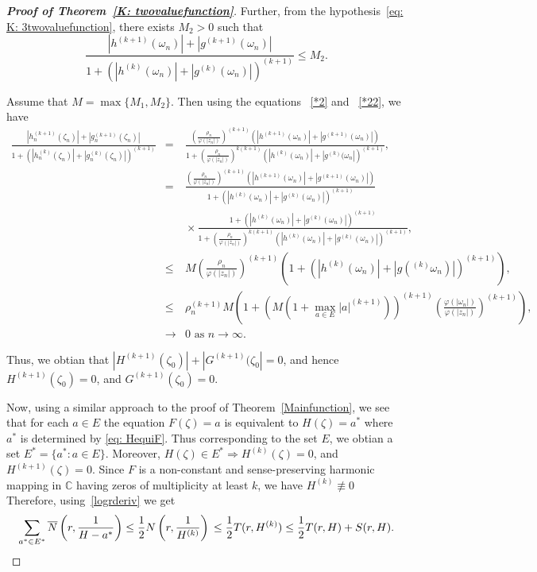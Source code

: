 \documentclass[11pt, reqno]{amsart}
\numberwithin{equation}{section}
\theoremstyle{definition}
\theoremstyle{remark}
\theoremstyle{plain}
\begin{document}
\begin{proof}[\bf{Proof of Theorem~\ref{K: twovaluefunction}}]
Further, from the hypothesis~\eqref{eq: K: 3twovaluefunction},
there exists $M_2>0$ such that
\begin{equation}\label{*22}
  \frac{|h^{(k+1)}(\omega_n)|+|g^{(k+1)}(\omega_n)|}
  {1+(|h^{(k)}(\omega_n)|+|g^{(k)}(\omega_n)|)^{(k+1)}}\leq M_2.
\end{equation}

Assume that $M=\max\{M_1, M_2\}$. Then using the equations ~\eqref{*2} 
and ~\eqref{*22}, we have
\begin{eqnarray*}
  \frac{|h_n^{(k+1)}(\zeta_n)|+|g_n^{(k+1)}(\zeta_n)|}
  {1+(|h_n^{(k)}(\zeta_n)|+|g_n^{(k)}(\zeta_n)|)^{(k+1)}} 
  &=& \frac{\left(\frac{\rho_n}{\varphi(|z_n|)}
  \right)^{(k+1)}\left(|h^{(k+1)}(\omega_n)|
  +|g^{(k+1)}(\omega_n)|\right)}{1+\left(\frac{\rho_n}
  {\varphi(|z_n|)}\right)^{k(k+1)}\left(|h^{(k)}(\omega_n)|+
  |g^{(k)}(\omega_n|\right)^{(k+1)}}, \\
  &=& \frac{\left(\frac{\rho_n}{\varphi(|z_n|)}\right)^{(k+1)}
  \left(|h^{(k+1)}(\omega_n)|+|g^{(k+1)}(\omega_n)|\right)}
  {1+\left(|h^{(k)}(\omega_n)|+|g^{(k)}(\omega_n)|\right)^{(k+1)}}\\ 
  &&\!\times\!
  \frac{1+\left(|h^{(k)}(\omega_n)|+|g^{(k)}(\omega_n)|\right)^{(k+1)}}
  {1+\left(\frac{\rho_n}{\varphi(|z_n|)}\right)^{k(k+1)}
  \left(|h^{(k)}(\omega_n)|+|g^{(k)}(\omega_n)|\right)^{(k+1)}}, \\
   &\leq& M \left(\frac{\rho_n}{\varphi(|z_n|)}\right)^{(k+1)}
   \left(1+\left(|h^{(k)}(\omega_n)|+|g(^{(k)}\omega_n)|\right)^{(k+1)}\right),\\
  &\leq& \rho_n^{(k+1)} M \left(1+(M(1+\max_{a\in E}
  |a|^{(k+1)}))^{(k+1)}\left(\frac{\varphi(|\omega_n|)}
  {\varphi(|z_n|)}\right)^{(k+1)}\right),
   \\
  &\to & 0 \,\, \text{as}\,\, n \to \infty.
\end{eqnarray*}

Thus, we obtian that $|H^{(k+1)}(\zeta_0)|+|G^{(k+1)}(\zeta_0|=0$, and
 hence $H^{(k+1)}(\zeta_0)=0$, and 
 $G^{(k+1)}(\zeta_0)=0$.\smallskip
 
Now, using a similar approach to the proof of Theorem~\ref{Mainfunction}, we see that 
for each $a\in E$ the equation $F(\zeta)=a$ is equivalent to $H(\zeta)=a^*$ where $a^*$
 is determined by \eqref{eq: HequiF}.  Thus  
 corresponding to the set $E$, we obtian a set $E^*=\{a^*: a\in E\}$. Moreover,
 $H(\zeta)\in E^*\Longrightarrow H^{(k)}(\zeta)=0$, and 
 $H^{(k+1)}(\zeta)=0$. Since $F$ 
is a non-constant and sense-preserving harmonic mapping in
 $\mathbb{C}$ having zeros of multiplicity at least
$k$, we have $H^{(k)}\not\equiv 0$
 Therefore, using~\eqref{logrderiv} we get
 \[
\sum_{a^* \in E^*}\overline{N}\left(r, \frac{1}{H-a^*}\right)\leq
\frac{1}{2}N\left(r,\frac{1}{H^{(k)}}\right)\\ \leq \frac{1}{2} 
T(r,H^{(k)})\leq \frac{1}{2} T(r,H)+S(r,H).\]


\end{proof}
\end{document}

